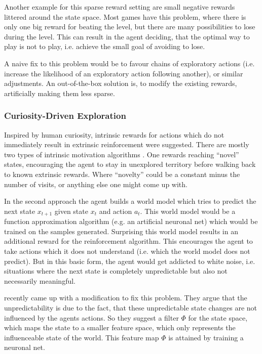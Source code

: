 Another example for this sparse reward setting are small negative rewards littered around the state space. Most games have this problem, where there is only one big reward for beating the level, but there are many possibilities to lose during the level. This can result in the agent deciding, that the optimal way to play is not to play, i.e. achieve the small goal of avoiding to lose.  

A naive fix to this problem would be to favour chains of exploratory actions (i.e. increase the likelihood of an exploratory action following another), or similar adjustments. An out-of-the-box solution is, to modify the existing rewards, artificially making them less sparse. 

\subsubsection{Curiosity-Driven Exploration}

Inspired by human curiosity, intrinsic rewards for actions which do not immediately result in extrinsic reinforcement were suggested. There are mostly two types of intrinsic motivation algorithms \parencite{pathakCuriosityDrivenExplorationSelfSupervised2017}. One rewards reaching ``novel'' states, encouraging the agent to stay in unexplored territory before walking back to known extrinsic rewards. Where ``novelty'' could be a constant minus the number of visits, or anything else one might come up with. 

In the second approach the agent builds a world model which tries to predict the next state \(x_{t+1}\) given state \(x_t\) and action \(a_t\). This world model would be a function approximation algorithm (e.g. an artificial neuronal net) which would be trained on the samples generated. Surprising this world model results in an additional reward for the reinforcement algorithm. This encourages the agent to take actions which it does not understand (i.e. which the world model does not predict). But in this basic form, the agent would get addicted to white noise, i.e. situations where the next state is completely unpredictable but also not necessarily meaningful.

\textcite{pathakCuriosityDrivenExplorationSelfSupervised2017}
recently came up with a modification to fix this problem. They argue that the unpredictability is due to the fact, that these unpredictable state changes are not influenced by the agents actions. 
So they suggest a filter \(\Phi\) for the state space, which maps the state to a smaller feature space, which only represents the influenceable state of the world. This feature map \(\Phi\) is attained by training a neuronal net.

